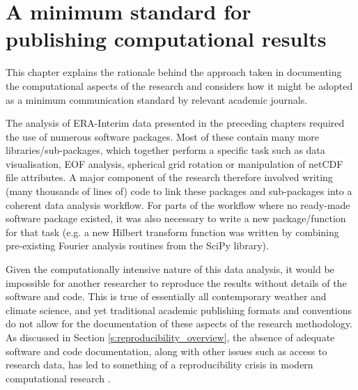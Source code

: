 
\chapter{A minimum standard for publishing computational results}\label{c:reproducibility}


\begin{synopsis}
This chapter explains the rationale behind the approach taken in documenting the computational aspects of the research and considers how it might be adopted as a minimum communication standard by relevant academic journals.
\vspace{1cm}
\end{synopsis}



The analysis of ERA-Interim data presented in the preceding chapters required the use of numerous software packages. Most of these contain many more libraries/sub-packages, which together perform a specific task such as data visualisation, EOF analysis, spherical grid rotation or manipulation of netCDF file attributes. A major component of the research therefore involved writing (many thousands of lines of) code to link these packages and sub-packages into a coherent data analysis workflow. For parts of the workflow where no ready-made software package existed, it was also necessary to write a new package/function for that task (e.g. a new Hilbert transform function was written by combining pre-existing Fourier analysis routines from the SciPy library).

Given the computationally intensive nature of this data analysis, it would be impossible for another researcher to reproduce the results without details of the software and code. This is true of essentially all contemporary weather and climate science, and yet traditional academic publishing formats and conventions do not allow for the documentation of these aspects of the research methodology. As discussed in Section \ref{s:reproducibility_overview}, the absence of adequate software and code documentation, along with other issues such as access to research data, has led to something of a reproducibility crisis in modern computational research \citep[e.g.][]{Peng2011}. 

